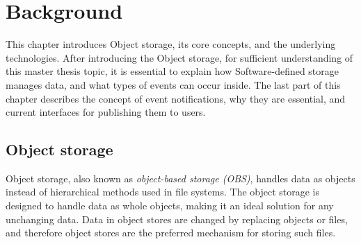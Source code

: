 \chapter{Background}

This chapter introduces Object storage, its core concepts, and the underlying technologies. After introducing the Object storage, for sufficient understanding of this master thesis topic, it is essential to explain how Software-defined storage manages data, and what types of events can occur inside. The last part of this chapter describes the concept of event notifications, why they are essential, and current interfaces for publishing them to users.

\section{Object storage}
    Object storage, also known as \textit{object-based storage (OBS)}, handles data as objects instead of hierarchical methods used in file systems\cite{objectBasedStorage}. The object storage is designed to handle data as whole objects, making it an ideal solution for any unchanging data. Data in object stores are changed by replacing objects or files, and therefore object stores are the preferred mechanism for storing such files\cite{networkStorage}.

